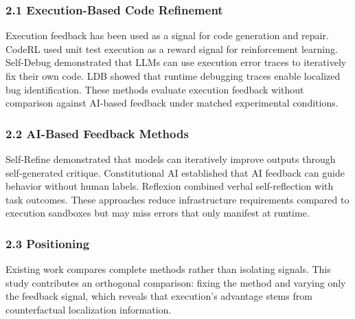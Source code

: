 
\subsubsection{2.1 Execution-Based Code Refinement}

Execution feedback has been used as a signal for code generation and repair. CodeRL \citep{le2022coderl} used unit test execution as a reward signal for reinforcement learning. Self-Debug \citep{Chen2023} demonstrated that LLMs can use execution error traces to iteratively fix their own code. LDB \citep{li2024ldb} showed that runtime debugging traces enable localized bug identification. These methods evaluate execution feedback without comparison against AI-based feedback under matched experimental conditions.

\subsubsection{2.2 AI-Based Feedback Methods}

Self-Refine \citep{madaan2023self} demonstrated that models can iteratively improve outputs through self-generated critique. Constitutional AI \citep{bai2022constitutional} established that AI feedback can guide behavior without human labels. Reflexion \citep{shinn2023reflexion} combined verbal self-reflection with task outcomes. These approaches reduce infrastructure requirements compared to execution sandboxes but may miss errors that only manifest at runtime.

\subsubsection{2.3 Positioning}

Existing work compares complete methods rather than isolating signals. This study contributes an orthogonal comparison: fixing the method and varying only the feedback signal, which reveals that execution's advantage stems from counterfactual localization information.

